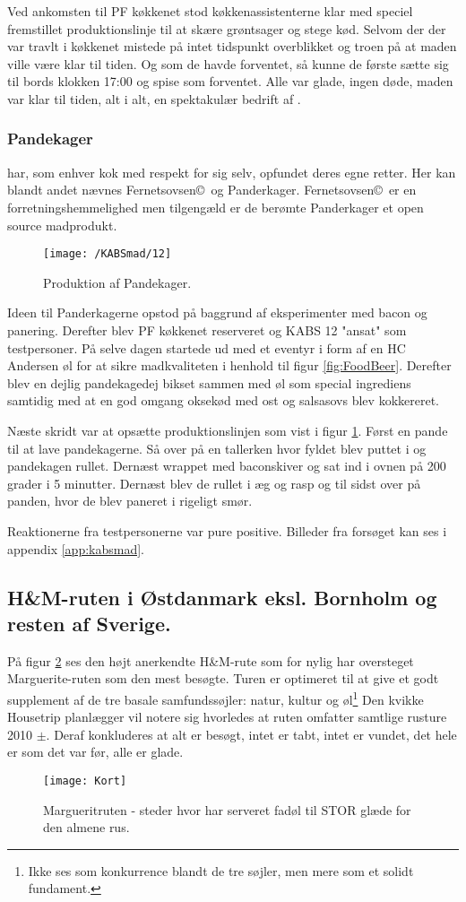 Ved ankomsten til PF køkkenet stod køkkenassistenterne klar med speciel fremstillet produktionslinje til at skære grøntsager og stege kød. Selvom der der var travlt i køkkenet mistede \HM på intet tidspunkt overblikket og troen på at maden ville være klar til tiden. Og som de havde forventet, så kunne de første sætte sig til bords klokken 17:00 og spise som forventet. Alle var glade, ingen døde, maden var klar til tiden, alt i alt, en spektakulær bedrift af \HM.

\subsubsection{\HM Pandekager}
\HM har, som enhver kok med respekt for sig selv, opfundet deres egne retter. Her kan blandt andet nævnes Fernetsovsen\textregistered \copyright \texttrademark \ og \HM Panderkager. Fernetsovsen\textregistered \copyright \texttrademark \ er en forretningshemmelighed men tilgengæld er de berømte \HM Panderkager et open source madprodukt.

\begin{figure}[h!]
\centering
\texttt{[image: /KABSmad/12]}
\caption{Produktion af \HM Pandekager.}
\label{fig:pandekager}
\end{figure}

Ideen til \HM Panderkagerne opstod på baggrund af eksperimenter med bacon og panering. Derefter blev PF køkkenet reserveret og KABS 12 "ansat" som testpersoner. På selve dagen startede \HM ud med et eventyr i form af en HC Andersen øl for at sikre madkvaliteten i henhold til figur \ref{fig:FoodBeer}. Derefter blev en dejlig pandekagedej bikset sammen med øl som special ingrediens samtidig med at en god omgang oksekød med ost og salsasovs blev kokkereret. 

Næste skridt var at opsætte produktionslinjen som vist i figur \ref{fig:pandekager}. Først en pande til at lave pandekagerne. Så over på en tallerken hvor fyldet blev puttet i og pandekagen rullet. Dernæst wrappet med baconskiver og sat ind i ovnen på 200 grader i 5 minutter. Dernæst blev de rullet i æg og rasp og til sidst over på panden, hvor de blev paneret i rigeligt smør.

Reaktionerne fra testpersonerne var pure positive. Billeder fra forsøget kan ses i appendix \ref{app:kabsmad}. 

\subsection{H\&M-ruten i Østdanmark eksl. Bornholm og resten af Sverige.}
På figur \ref{fig:Kort} ses den højt anerkendte H\&M-rute som for nylig har oversteget Marguerite-ruten som den mest besøgte\cite{bib:url:Marguerit}. Turen er optimeret til at give et godt supplement af de tre basale samfundssøjler: natur, kultur og øl\footnote{Ikke ses som konkurrence blandt de tre søjler, men mere som et solidt fundament.} Den kvikke Housetrip planlægger vil notere sig hvorledes at ruten omfatter samtlige rusture 2010 $\pm$. Deraf konkluderes at alt er besøgt, intet er tabt, intet er vundet, det hele er som det var før, alle er glade.  

\begin{figure}[h!]
\centering
\texttt{[image: Kort]}
\caption{Margueritruten - steder hvor \HM har serveret fadøl til STOR glæde for den almene rus.}
\label{fig:Kort}
\end{figure}